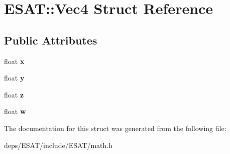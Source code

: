 \hypertarget{struct_e_s_a_t_1_1_vec4}{}\section{E\+S\+AT\+:\+:Vec4 Struct Reference}
\label{struct_e_s_a_t_1_1_vec4}
\subsection*{Public Attributes}
\begin{DoxyCompactItemize}
\item 
\mbox{\label{struct_e_s_a_t_1_1_vec4_aca0e03c7491084d3875ab811799f171f}} 
float {\bfseries x}
\item 
\mbox{\label{struct_e_s_a_t_1_1_vec4_ab17511d03202b058e315b8b6a4a6fb6c}} 
float {\bfseries y}
\item 
\mbox{\label{struct_e_s_a_t_1_1_vec4_a3bc9750b37b2b798e29eb6e347058634}} 
float {\bfseries z}
\item 
\mbox{\label{struct_e_s_a_t_1_1_vec4_a8330457bca000e2b1bc7be30cd9bf82b}} 
float {\bfseries w}
\end{DoxyCompactItemize}


The documentation for this struct was generated from the following file\+:\begin{DoxyCompactItemize}
\item 
deps/\+E\+S\+A\+T/include/\+E\+S\+A\+T/math.\+h\end{DoxyCompactItemize}
